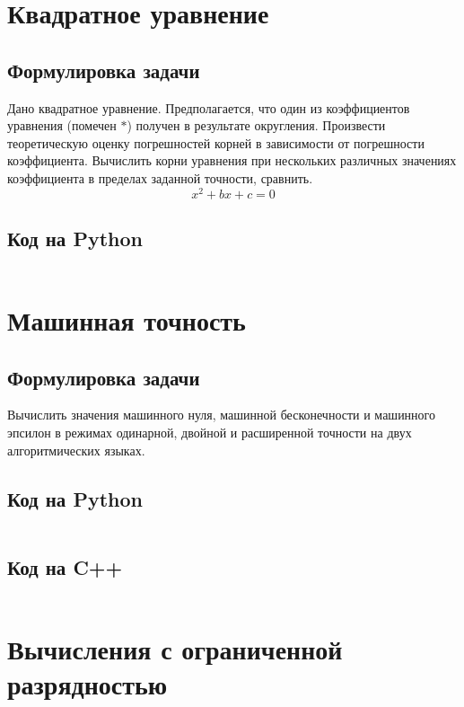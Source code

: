 \documentclass[a4paper,12pt]{article}
\newenvironment{longlisting}{\captionsetup{type=listing}}{}
\begin{document}
\section{Квадратное уравнение}
\subsection{Формулировка задачи}
Дано квадратное уравнение. Предполагается, что один из коэффициентов уравнения (помечен $*$) получен в результате округления. Произвести теоретическую оценку погрешностей корней в зависимости от погрешности коэффициента. Вычислить корни уравнения при нескольких различных значениях коэффициента в пределах заданной точности, сравнить.
    $$x^2+bx+c = 0$$
    $$ $$
   
\subsection{Код на Python}
\begin{longlisting}
\inputminted{python}{quadratic_eq.py}
\end{longlisting}

\section{Машинная точность}
\subsection{Формулировка задачи}
Вычислить значения машинного нуля, машинной бесконечности и машинного эпсилон в режимах одинарной, двойной и расширенной точности на двух алгоритмических языках.
\subsection{Код на Python}

\begin{longlisting}
\inputminted{python}{precision.py}
\end{longlisting}

\subsection{Код на C++}
\begin{longlisting}
\inputminted{c++}{precision.cpp}
\end{longlisting}


\section{Вычисления с ограниченной разрядностью}
\end{document}

